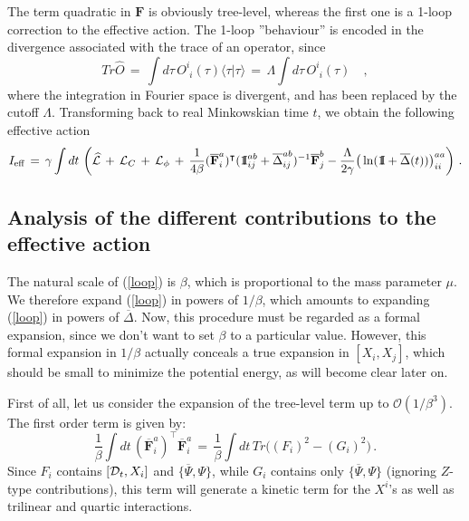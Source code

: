\documentclass[a4paper,11pt]{article}
\def\Id{{\rm 1\kern-.28em I}}
\begin{document}
The term quadratic in $\mathbf{F}$ is obviously tree-level, whereas the first one is a  1-loop correction
to the effective action. The 1-loop ''behaviour'' is encoded in the divergence associated with 
the trace of an operator, since
\begin{equation}\label{oper}
Tr\widehat{O}\,=\,\int d\tau\,O_{\phantom{i}i}^{i}(\tau)\langle \tau | \tau \rangle
\,=\,\Lambda \int d\tau \,O_{\phantom{i}i}^{i}(\tau)\quad ,
\end{equation}
where the integration in Fourier space is divergent, and has been replaced by the cutoff $\Lambda$.
Transforming back to real Minkowskian time $t$, we obtain the following effective 
action
\begin{equation}
I_{\text{eff}}\,=\,\gamma \int dt\,\left( \widehat{\mathcal{L}
}\,+\,\mathcal{L}_{C}\,+\,\mathcal{L}_{\phi }\,+\,\frac{1}{4\beta }(
\overline{\mathbf{F}}_{i}^{a})^{\intercal }(\Id_{ij}^{ab}+\overline{\Delta }
_{ij}^{ab})^{-1}\overline{\mathbf{F}}_{j}^{b} -\frac{\Lambda}{2\gamma} 
\big(\ln (\Id+\overline{\Delta}(t))\big)_{ii}^{aa}\right)\,.   \label{loop}
\end{equation}

\subsection{Analysis of the different contributions to the effective action}

The natural scale of (\ref{loop}) is $\beta $, which is proportional to the mass
parameter $\mu$. We therefore expand (\ref{loop}) in
powers of $1/\beta $, which amounts to expanding (\ref{loop})
in powers of $\overline{\Delta }$. Now, this procedure must be
regarded as a formal expansion, since we don't want to set $\beta$ to a particular value. 
However, this formal expansion in $1/\beta $ actually conceals a true expansion in $[X_{i},X_{j}]$, 
which should be small to minimize the potential energy, as will become clear later on.

First of all, let us consider the expansion of the tree-level term up to 
$\mathcal{O}(1/\beta ^{3})$. The first order term is given by: 
\begin{equation*}
\frac{1}{\beta }\int dt\,(\overline{\mathbf{F}}_{i}^{a})^{\intercal} \overline{\mathbf{F}}_{i}^{a}\,=
\,\frac{1}{\beta }\int
 dt\,Tr\Big((F_{i})^{2}-(G_{i})^{2}\Big) \,.
\end{equation*}
Since $F_{i}$ contains $[{\cal D}_t,X_i]$ and $\{\overline{\Psi},\Psi\}$, while $G_{i}$ 
contains only $\{\overline{\Psi},\Psi\}$ (ignoring $Z$-type contributions), this term will 
generate a kinetic term for the $X^i$'s as well as trilinear and quartic interactions.
\end{document}
